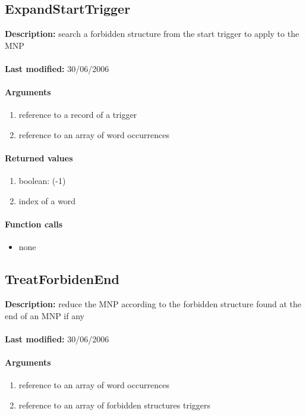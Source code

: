 \subsection{ExpandStartTrigger}
\textbf{Description:} search a forbidden structure from the start trigger to apply to the MNP\\
\\\textbf{Last modified:} 30/06/2006

\paragraph{Arguments}
\begin{enumerate}
\item reference to a record of a trigger
\item reference to an array of word occurrences
\end{enumerate}

\paragraph{Returned values}
\begin{enumerate}
\item boolean: (-1)
\item index of a word
\end{enumerate}

\paragraph{Function calls}
\begin{itemize}
\item none
\end{itemize}

\subsection{TreatForbidenEnd}
\textbf{Description:} reduce the MNP according to the forbidden structure found at the end of an MNP if any\\
\\\textbf{Last modified:} 30/06/2006

\paragraph{Arguments}
\begin{enumerate}
\item reference to an array of word occurrences
\item reference to an array of forbidden structures triggers
\end{enumerate}

